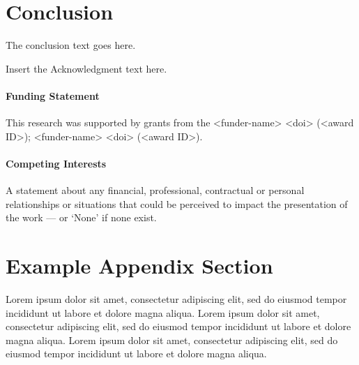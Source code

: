 \documentclass[
  journal=kielnarowa,
  year=2024,
  volume=1,
]{cup-journal}
\begin{document}
\section{Conclusion}
The conclusion text goes here.


\begin{acknowledgement}
Insert the Acknowledgment text here.
\end{acknowledgement}

\paragraph{Funding Statement}

This research was supported by grants from the <funder-name> <doi> (<award ID>); <funder-name> <doi> (<award ID>).

\paragraph{Competing Interests}

A statement about any financial, professional, contractual or personal relationships or situations that could be perceived to impact the presentation of the work --- or `None' if none exist.


\printendnotes

\printbibliography

\appendix

\section{Example Appendix Section}

Lorem ipsum dolor sit amet, consectetur adipiscing elit, sed do eiusmod tempor incididunt ut labore et dolore magna aliqua. Lorem ipsum dolor sit amet, consectetur adipiscing elit, sed do eiusmod tempor incididunt ut labore et dolore magna aliqua. Lorem ipsum dolor sit amet, consectetur adipiscing elit, sed do eiusmod tempor incididunt ut labore et dolore magna aliqua. 
\end{document}
